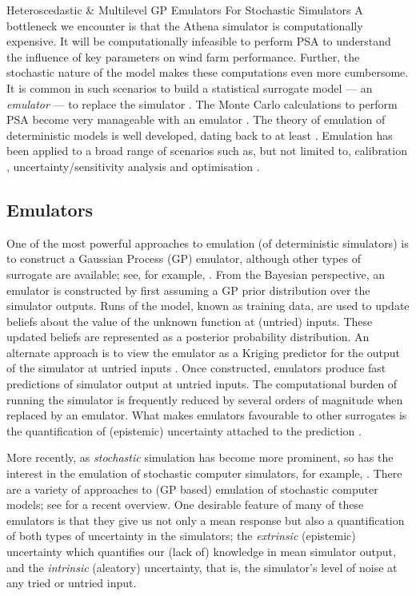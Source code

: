 \begin{chapter}{Heteroscedastic \& Multilevel GP Emulators For Stochastic Simulators\label{Ch:Hetsml}}
A bottleneck we encounter is that the Athena simulator is computationally expensive. It will be computationally infeasible to perform PSA to understand the influence of key parameters on wind farm performance. Further, the stochastic nature of the model makes these computations even more cumbersome. It is common in such scenarios to build a statistical surrogate model --- an \emph{emulator} --- to replace the simulator \citep{Gramacy2020surrogates}. The Monte Carlo calculations to perform PSA become very manageable with an emulator \citep{Marrel2012}. The theory of emulation of deterministic models is well developed, dating back to at least \citet{Sacks89}. Emulation has been applied to a broad range of scenarios such as, but not limited to, calibration \citep{Ohagan01}, uncertainty/sensitivity analysis \citep{Kennedy2006} and optimisation \citep{Wilson2018}.

\subsection{Emulators}

One of the most powerful approaches to emulation (of deterministic simulators) is to construct a Gaussian Process (GP) emulator, although other types of surrogate are available; see, for example, \citet{Goldstein2006,Sudret2008, Rougier2010}. From the Bayesian perspective, an emulator is constructed by first assuming a GP prior distribution over the simulator outputs. Runs of the model, known as training data, are used to update beliefs about the value of the unknown function at (untried) inputs. These updated beliefs are represented as a posterior probability distribution. An alternate approach is to view the emulator as a Kriging predictor for the output of the simulator at untried inputs \citep{Sacks89}. Once constructed, emulators produce fast predictions of simulator output at untried inputs. The computational burden of running the simulator is frequently reduced by several orders of magnitude when replaced by an emulator. What makes emulators favourable to other surrogates is the quantification of (epistemic) uncertainty attached to the prediction \citep{Ohagan2006}.

More recently, as \emph{stochastic} simulation has become more prominent, so has the interest in the emulation of stochastic computer simulators, for example, \citet{Astfalck19, Rocchetta2018, Boys2018}. There are a variety of approaches to (GP based) emulation of stochastic computer models; see \citet{Baker2020} for a recent overview. One desirable feature of many of these emulators is that they give us not only a mean response but also a quantification of both types of uncertainty in the simulators; the \emph{extrinsic} (epistemic) uncertainty which quantifies our (lack of) knowledge in mean simulator output, and the \emph{intrinsic} (aleatory) uncertainty, that is, the simulator's level of noise at any tried or untried input.


\end{chapter}
